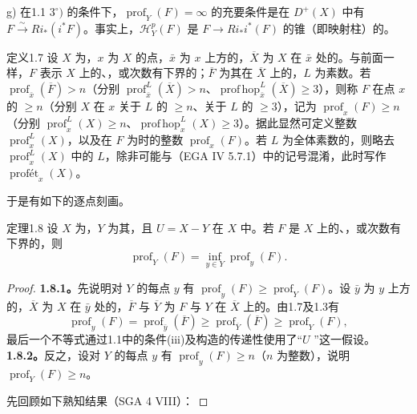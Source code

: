 g) 在1.1 $3^\circ)$ 的条件下，$\operatorname{prof}_Y(F)=\infty$ 的充要条件是在 $D^+(X)$ 中有 $F\xrightarrow{\sim}Ri_*(i^*F)$。事实上，$\mathcal H_Y^p(F)$ 是 $F\to Ri_*i^*(F)$ 的锥（即映射柱）的。
\begin{SGAresult}{定义}{1.7}
设 $X$ 为，$x$ 为 $X$ 的点，$\bar x$ 为 $x$ 上方的，$\overline X$ 为 $X$ 在 $\bar x$ 处的。与前面一样，$F$ 表示 $X$ 上的、，或次数有下界的；$\overline F$ 为其在 $\overline X$ 上的，$L$ 为素数。若 $\operatorname{prof}_{\bar x}(\overline F)>n$（分别 $\operatorname{prof}_{\bar x}^L(\overline X)>n$、$\operatorname{prof\,hop}_{\bar x}^L(\overline X)\geq3$），则称 $F$ 在点 $x$ 的 $\geq n$（分别 $X$ 在 $x$ 关于 $L$ 的 $\geq n$、关于 $L$ 的 $\geq3$），记为 $\operatorname{prof}_x(F)\geq n$（分别 $\operatorname{prof}_x^L(X)\geq n$、$\operatorname{prof\,hop}_x^L(X)\geq3$）。据此显然可定义整数 $\operatorname{prof}_x^L(X)$，以及在 $F$ 为时的整数 $\operatorname{prof}_x(F)$。若 $L$ 为全体素数的，则略去 $\operatorname{prof}_x^L(X)$ 中的 $L$，除非可能与（EGA IV 5.7.1）中的记号混淆，此时写作 $\operatorname{prof\text{ét}}_x(X)$。
\end{SGAresult}
于是有如下的逐点刻画。
\begin{SGAresult}{定理}{1.8}
设 $X$ 为，$Y$ 为其，且 $U=X-Y$ 在 $X$ 中。若 $F$ 是 $X$ 上的、，或次数有下界的，则
\[\operatorname{prof}_Y(F)=\inf_{y\in Y}\operatorname{prof}_y(F).\]
\end{SGAresult}
\begin{proof}
\textbf{1.8.1。}先说明对 $Y$ 的每点 $y$ 有 $\operatorname{prof}_y(F)\geq\operatorname{prof}_Y(F)$。设 $\bar y$ 为 $y$ 上方的，$\overline X$ 为 $X$ 在 $\bar y$ 处的，$\overline F$ 与 $\overline Y$ 为 $F$ 与 $Y$ 在 $\overline X$ 上的。由1.7及1.3有
\[\operatorname{prof}_y(F)=\operatorname{prof}_{\bar y}(\overline F)\geq\operatorname{prof}_{\overline Y}(\overline F)\geq\operatorname{prof}_Y(F),\]
最后一个不等式通过1.1中的条件(iii)及构造的传递性使用了“$U$ ”这一假设。
\textbf{1.8.2。}反之，设对 $Y$ 的每点 $y$ 有 $\operatorname{prof}_y(F)\geq n$（$n$ 为整数），说明 $\operatorname{prof}_Y(F)\geq n$。

先回顾如下熟知结果（SGA 4 VIII）：
\end{proof}
